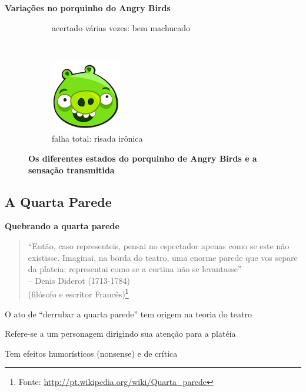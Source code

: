 \expandafter\documentclass\expandafter[table, usenames, svgnames, dvipsnames, \classopts]{beamer}
\begin{document}
\begin{frame}{\textbf{Variações no porquinho do Angry Birds}}
\begin{figure}
\begin{subfigure}[!h]{0.2\paperwidth}
	        \caption{\scriptsize acertado várias vezes: bem machucado}
	    \end{subfigure}
	    ~
		\begin{subfigure}[!h]{0.2\paperwidth}
			\centering
	        \includegraphics[height=0.2\paperheight]{angry-birds-pig5}
	        \caption{\scriptsize falha total: risada irônica}
	    \end{subfigure}

	    \caption{\textbf{Os diferentes estados do porquinho de Angry Birds e a sensação transmitida}}
    \end{figure}

\end{frame}

\subsection{A Quarta Parede}

\begin{frame}{\textbf{Quebrando a quarta parede}}

	\begin{quotation}
		\noindent
		``Então, caso representeis, pensai no espectador apenas como se este não existisse. Imaginai, na borda do teatro, uma enorme parede que vos separe da plateia; representai como se a cortina não se levantasse''\\
		\hfill -- Denis Diderot (1713-1784)\\
		\hfill (filósofo e escritor Francês)\footnote{Fonte: \url{http://pt.wikipedia.org/wiki/Quarta_parede}}
	\end{quotation}
	
	\vspace{1em}

	\begin{outline}
		\1 O ato de ``derrubar a quarta parede'' tem origem na teoria do teatro
		
		\1 Refere-se a um personagem dirigindo sua atenção para a platéia
			
		\1 Tem efeitos humorísticos (nonsense) e de crítica
	\end{outline}

\end{frame}
\end{document}
